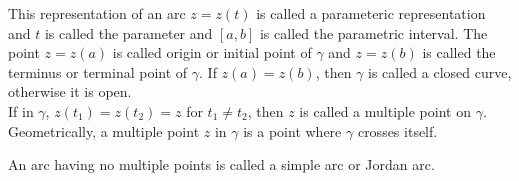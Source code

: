 





	This representation of an arc $z = z(t)$ is called a parameteric representation and $t$ is called the parameter and $[a,b]$ is called the parametric interval.
	The point $z = z(a)$ is called origin or initial point of $\gamma$ and $z = z(b)$ is called the terminus or terminal point of $\gamma$.
	If $z(a) = z(b)$, then $\gamma$ is called a closed curve, otherwise it is open.\\


	If in $\gamma$, $z(t_1) = z(t_2) = z$ for $t_1 \ne t_2$, then $z$ is called a multiple point on $\gamma$.
	Geometrically, a multiple point $z$ in $\gamma$ is a point where $\gamma$ crosses itself.

	An arc having no multiple points is called a simple arc or Jordan arc.


